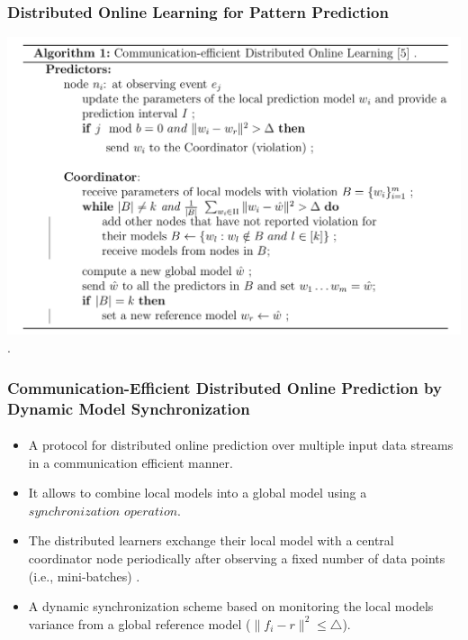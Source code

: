 \frame
{
	\frametitle{Distributed Online Learning for Pattern Prediction}
	\begin{center}
		\includegraphics[width=\textwidth,left]{figures/new/dol.png}\\
.
	\end{center}
}


\frame
{
	\frametitle{ Communication-Efficient Distributed Online Prediction by Dynamic Model Synchronization  \citep{kamp2014communication}}
	\framesubtitle{}
	\begin{itemize}[]
		\item<1-> A protocol for distributed online prediction over multiple input data streams in a communication efficient manner.
		\item<1-> It allows to combine local models into a global model
	using a $synchronization$ $ operation$.
		\item<1-> The distributed learners exchange their local model with a central coordinator node periodically after observing a fixed number of data points (i.e., mini-batches) \citep{dekel2012optimal}.
		
		\item<1-> A dynamic synchronization scheme based on monitoring the local models variance from a global reference model ($\|f_i - r\|^2 \leq \bigtriangleup$).
		
		
	\end{itemize}
}


